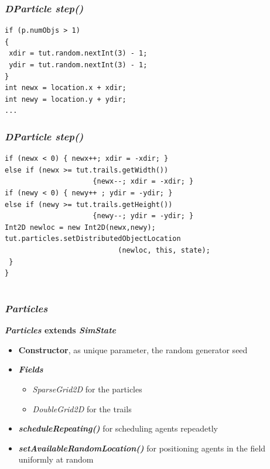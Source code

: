 \documentclass[]{beamer}
\begin{document}
\begin{frame}[fragile]
\frametitle{\textit{DParticle step()}}
\begin{lstlisting}
if (p.numObjs > 1)
{
 xdir = tut.random.nextInt(3) - 1;
 ydir = tut.random.nextInt(3) - 1;
}
int newx = location.x + xdir;
int newy = location.y + ydir;
...
\end{lstlisting}
\end{frame}

\begin{frame}[fragile]
\frametitle{\textit{DParticle step()}}
\begin{lstlisting}
if (newx < 0) { newx++; xdir = -xdir; }
else if (newx >= tut.trails.getWidth())
                     {newx--; xdir = -xdir; }
if (newy < 0) { newy++ ; ydir = -ydir; }
else if (newy >= tut.trails.getHeight())
                     {newy--; ydir = -ydir; }
Int2D newloc = new Int2D(newx,newy);
tut.particles.setDistributedObjectLocation
                           (newloc, this, state);
 }
}

\end{lstlisting}
\end{frame}

\section[Particles]{}

\begin{frame}
\frametitle{\textit{Particles}}
\textbf{\textit{Particles} extends \textit{SimState}}
\begin{itemize}
	\item \textbf{Constructor}, as unique parameter, the random generator seed
	\item\textbf{\textit{Fields}}
	\begin{itemize}
		\item \textit{SparseGrid2D} for the particles
		\item \textit{DoubleGrid2D} for the trails
	\end{itemize}
	\item \textbf{\textit{scheduleRepeating()}} for scheduling agents repeadetly
	\item \textbf{\textit{setAvailableRandomLocation()}} for positioning agents in the field uniformly at random
\end{itemize}
\end{frame}
\end{document}
